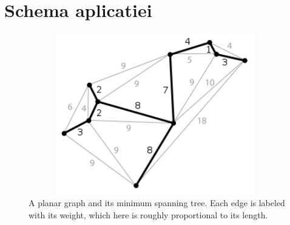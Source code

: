 \documentclass[12pt]{article}
\begin{document}
\section{Schema aplicatiei}
\begin{figure}[ht!]
\centering
\includegraphics[width=110mm,height=70mm]{1.png}
\caption{ A planar graph and its minimum spanning tree. Each edge is labeled with its weight, which here is roughly proportional to its length.\label{overflow}}
\end{figure}
\end{document}

